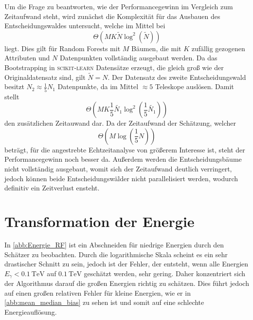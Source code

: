 Um die Frage zu beantworten, wie der Performancegewinn im Vergleich zum Zeitaufwand steht, wird zunächst die Komplexität für das Ausbauen des Entscheidungswaldes untersucht,
welche im Mittel bei
\begin{equation}
  \Theta (MK\tilde{N} \log^2\left(\tilde{N}\right))
\end{equation}
liegt\cite[96]{understanding_RF}.
Dies gilt für Random Forests mit $M$ Bäumen, die mit $K$ zufällig gezogenen Attributen und $N$ Datenpunkten vollständig ausgebaut werden.
Da das Bootstrapping in \textsc{scikit-learn} Datensätze erzeugt, die gleich groß wie der Originaldatensatz sind, gilt $\tilde{N}= N$.
Der Datensatz des zweite Entscheidungswald besitzt $N_2 \approx \frac{1}{5}N_1$ Datenpunkte, da im Mittel $\approx 5$ Teleskope auslösen.
Damit stellt
\begin{equation}
  \Theta \left(MK\frac{1}{5}\tilde{N_1} \log^2\left(\frac{1}{5}\tilde{N_1}\right)\right)
\end{equation}
den zusätzlichen Zeitauwand dar.
Da der Zeitaufwand der Schätzung, welcher
\begin{equation}
  \Theta\left(M\log\left(\frac{1}{5}N\right)\right)
\end{equation}
beträgt\cite[98]{understanding_RF}, für die angestrebte Echtzeitanalyse von größerem Interesse ist, steht der Performancegewinn noch besser da.
Außerdem werden die Entscheidungsbäume nicht vollständig ausgebaut, womit sich der Zeitaufwand deutlich verringert, jedoch können beide Entscheidungswälder nicht
parallelisiert werden, wodurch definitiv ein Zeitverlust ensteht.

\section{Transformation der Energie}

In \autoref{abb:Energie_RF} ist ein Abschneiden für niedrige Energien durch den Schätzer zu beobachten.
Durch die logarithmische Skala scheint es ein sehr drastischer Schnitt zu sein, jedoch ist der Fehler, der entsteht, wenn alle Energien $E_\gamma < \SI{0.1}{\tera\eV}$
auf $\SI{0.1}{\tera\eV}$ geschätzt werden, sehr gering.
Daher konzentriert sich der Algorithmus darauf die großen Energien richtig zu schätzen.
Dies führt jedoch auf einen großen relativen Fehler für kleine Energien, wie er in \autoref{abb:mean_median_bias} zu sehen ist und somit auf eine schlechte
Energieauflösung.

